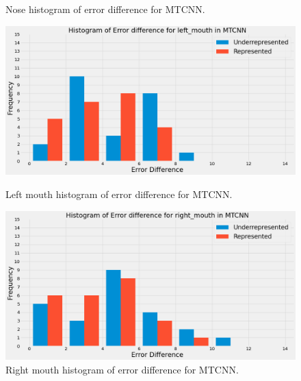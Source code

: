 \documentclass{l4proj}
\begin{document}
\begin{figure}[h!]
\begin{minipage}{0.51\textwidth}
    \caption{Nose histogram of error difference for MTCNN.}
    \label{mtcnn_nose}
  \end{minipage}
    \hfill
  \begin{minipage}{0.49\textwidth}
    \includegraphics[width=\textwidth]{images/mtcnn_leftmouth.png}
    \caption{Left mouth histogram of error difference for MTCNN.}
    \label{mtcnn_leftmouth}
  \end{minipage} 
      \hfill
    \begin{minipage}{0.49\textwidth}
    \includegraphics[width=\textwidth]{images/mtcnn_rightmouth.png}
    \caption{Right mouth histogram of error difference for MTCNN.}
    \label{mtcnn_rightmouth}
  \end{minipage} 
 
\end{figure}
\end{document}
